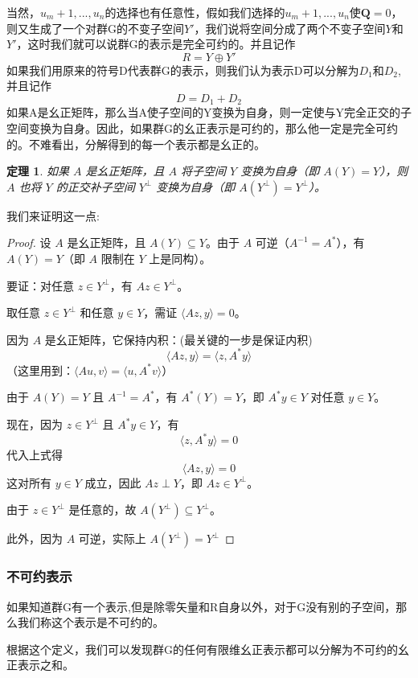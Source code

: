 \documentclass{ctexart}%
\newtheorem{theorem}{定理}
\begin{document}
当然，$u_m+1,...,u_n$的选择也有任意性，假如我们选择的$u_m+1,...,u_n$使$\mathbf{Q} = 0$，则又生成了一个对群G的不变子空间$Y'$，我们说将空间分成了两个不变子空间$Y$和$Y'$，这时我们就可以说群G的表示是完全可约的。并且记作
\[
R = Y \oplus Y'
\]
如果我们用原来的符号D代表群G的表示，则我们认为表示D可以分解为$D_1\text{和}D_2$,并且记作
\[
D = D_1 + D_2
\]
如果A是幺正矩阵，那么当A使子空间的Y变换为自身，则一定使与Y完全正交的子空间变换为自身。因此，如果群G的幺正表示是可约的，那么他一定是完全可约的。不难看出，分解得到的每一个表示都是幺正的。

\begin{theorem}
    如果 $A$ 是幺正矩阵，且 $A$ 将子空间 $Y$ 变换为自身（即 $A(Y) = Y$），则 $A$ 也将 $Y$ 的正交补子空间 $Y^\perp$ 变换为自身（即 $A(Y^\perp) = Y^\perp$）。
\end{theorem}
我们来证明这一点:
\begin{proof}
设 $A$ 是幺正矩阵，且 $A(Y) \subseteq Y$。由于 $A$ 可逆（$A^{-1} = A^*$），有 $A(Y) = Y$（即 $A$ 限制在 $Y$ 上是同构）。

要证：对任意 $z \in Y^\perp$，有 $Az \in Y^\perp$。

取任意 $z \in Y^\perp$ 和任意 $y \in Y$，需证 $\langle Az, y \rangle = 0$。

因为 $A$ 是幺正矩阵，它保持内积：(最关键的一步是保证内积)
\[
\langle Az, y \rangle = \langle z, A^* y \rangle
\]
（这里用到：$\langle Au, v \rangle = \langle u, A^* v \rangle$）

由于 $A(Y) = Y$ 且 $A^{-1} = A^*$，有 $A^*(Y) = Y$，即 $A^* y \in Y$ 对任意 $y \in Y$。

现在，因为 $z \in Y^\perp$ 且 $A^* y \in Y$，有
\[
\langle z, A^* y \rangle = 0
\]
代入上式得
\[
\langle Az, y \rangle = 0
\]
这对所有 $y \in Y$ 成立，因此 $Az \perp Y$，即 $Az \in Y^\perp$。

由于 $z \in Y^\perp$ 是任意的，故 $A(Y^\perp) \subseteq Y^\perp$。

此外，因为 $A$ 可逆，实际上 $A(Y^\perp) = Y^\perp$
\end{proof}
\subsubsection{不可约表示}
如果知道群G有一个表示,但是除零矢量和R自身以外，对于G没有别的子空间，那么我们称这个表示是不可约的。

根据这个定义，我们可以发现群G的任何有限维幺正表示都可以分解为不可约的幺正表示之和。
\end{document}
